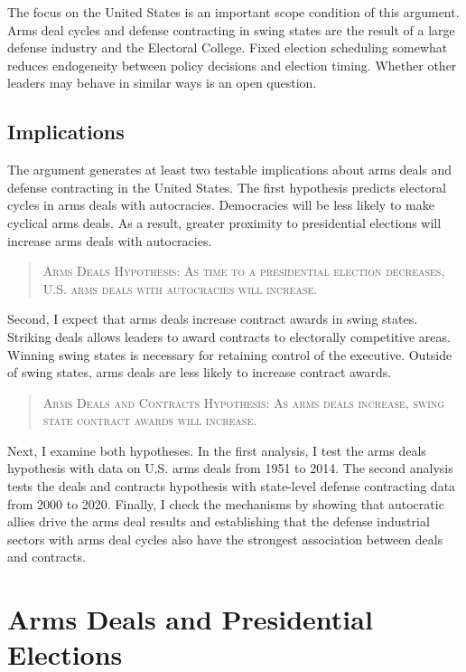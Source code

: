 \documentclass[12pt]{article}
\begin{document}
The focus on the United States is an important scope condition of this argument.
Arms deal cycles and defense contracting in swing states are the result of a large defense industry and the Electoral College. 
Fixed election scheduling somewhat reduces endogeneity between policy decisions and election timing. 
Whether other leaders may behave in similar ways is an open question. 



\subsection{Implications}


The argument generates at least two testable implications about arms deals and defense contracting in the United States. 
The first hypothesis predicts electoral cycles in arms deals with autocracies.
Democracies will be less likely to make cyclical arms deals. 
As a result, greater proximity to presidential elections will increase arms deals with autocracies. 


\begin{quote}
\textsc{Arms Deals Hypothesis: As time to a presidential election decreases, U.S. arms deals with autocracies will increase.}
\end{quote}


Second, I expect that arms deals increase contract awards in swing states.
Striking deals allows leaders to award contracts to electorally competitive areas. 
Winning swing states is necessary for retaining control of the executive. 
Outside of swing states, arms deals are less likely to increase contract awards. 


\begin{quote}
\textsc{Arms Deals and Contracts Hypothesis: As arms deals increase, swing state contract awards will increase.}
\end{quote}


Next, I examine both hypotheses. 
In the first analysis, I test the arms deals hypothesis with data on U.S. arms deals from 1951 to 2014.  
The second analysis tests the deals and contracts hypothesis with state-level defense contracting data from 2000 to 2020. 
Finally, I check the mechanisms by showing that autocratic allies drive the arms deal results and establishing that the defense industrial sectors with arms deal cycles also have the strongest association between deals and contracts. 


\section{Arms Deals and Presidential Elections}
\end{document}
